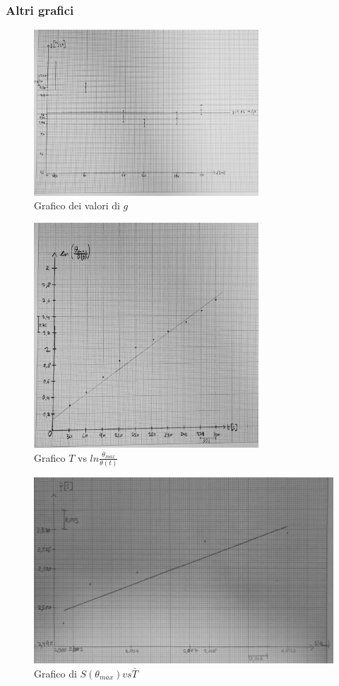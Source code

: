 \documentclass[a4paper]{article}
\begin{document}
\newpage
\subsubsection{Altri grafici}
\begin{figure}[!h]
    \centering
    \includegraphics[width=0.75\textwidth]{fotopendolo/confrontog.jpg}
    \caption{Grafico dei valori di $g$}
\end{figure}

\begin{figure}[!h]
    \centering
    \includegraphics[width=0.75\textwidth]{fotopendolo/lunghezzalog.jpg}
    \caption{Grafico $T$ vs $ln\frac{\theta_{max}}{\theta(t)}$}
\end{figure}

\begin{figure}[!ht]
    \centering
    \includegraphics[width=\textwidth]{fotopendolo/attrito.jpg}
    \caption{Grafico di $S(\theta_{max}) vs \bar{T}$}
\end{figure}
\end{document}

